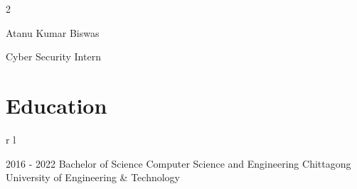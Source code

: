 \documentclass[
	10pt, %
]{RESUME}
\begin{document}
\begin{paracol}{2} %


	\parbox[][0.11\textheight][c]{\linewidth}{ %
		\centering %

		{\sffamily\Huge Atanu Kumar Biswas} %

		\medskip %

		{\cursivefont\Huge\textcolor{headings}{Cyber Security Intern}}

		\vfill %

	}



	\section{Education}





	\begin{supertabular}{r l} %


		\qualificationentry
		{2016 - 2022} %
		{Bachelor of Science} %
		{} %
		{Computer Science and Engineering } %
		{Chittagong University of Engineering \& Technology} %


\end{supertabular}
\end{paracol}
\end{document}
